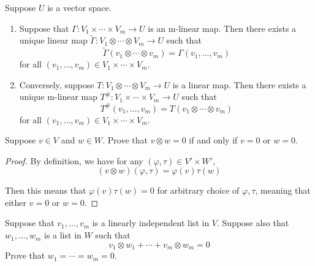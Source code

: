 \documentclass{extarticle}
\begin{document}
\begin{thm}
    Suppose \(U\) is a vector space. 

    \begin{enumerate}[label=(\alph*)]
        \item Suppose that \(\Gamma \colon V_1 \times \cdots \times V_m \to U\) is an m-linear map. 
        Then there exists a unique linear map \(\tilde{\Gamma} \colon V_1 \otimes \cdots \otimes V_m \to U\) 
        such that 
        \[\tilde{\Gamma}(v_1 \otimes \cdots \otimes v_m) = \Gamma(v_1, \ldots, v_m)\]
        for all \((v_1, \ldots, v_m) \in V_1 \times \cdots \times V_m\).
        
        \item Conversely, suppose \(T \colon V_1 \otimes \cdots \otimes V_m \to U\) is a linear map. 
        Then there exists a unique m-linear map \(T^{\#} \colon V_1 \times \cdots \times V_m \to U\)
        such that 
        \[T^\# (v_1, \ldots, v_m) = T(v_1 \otimes \cdots \otimes v_m)\]
        for all \((v_1, \ldots, v_m) \in V_1 \times \cdots \times V_m\). 
    \end{enumerate}
\end{thm}




\newpage 
{}


\begin{problem}{1}
    Suppose \(v \in V\) and \(w \in W\). Prove that \(v \otimes w = 0\) if and only if 
    \(v = 0\) or \(w = 0\).
\end{problem}

\begin{proof}
By definition, we have for any \((\varphi, \tau) \in V' \times W'\), 
\[(v \otimes w) (\varphi, \tau) = \varphi (v) \tau(w)\]

Then this means that \(\varphi(v) \tau(w) = 0\) for arbitrary choice of \(\varphi, \tau\), meaning 
that either \(v = 0\) or \(w = 0\).
\end{proof}


\begin{problem}{3}
    Suppose that \(v_1, \ldots, v_m\) is a linearly independent list in \(V\). Suppose also 
    that \(w_1, \ldots, w_m\) is a list in \(W\) such that 
    \[v_1 \otimes w_1 + \cdots + v_m \otimes w_m = 0\]
    Prove that \(w_1 = \cdots = w_m = 0\).
\end{problem}
\end{document}
